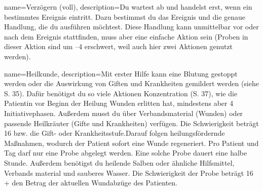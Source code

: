 {
    name={Verzögern (voll)},
    description={Du wartest ab und handelst erst, wenn ein bestimmtes Ereignis eintritt. Dazu bestimmst du das Ereignis und die genaue Handlung, die du ausführen möchtest. Diese Handlung kann unmittelbar vor oder nach dem Ereignis stattfinden, muss aber eine einfache Aktion sein (Proben in dieser Aktion sind um –4 erschwert, weil auch hier zwei Aktionen genutzt werden).}
}


{
    name={Heilkunde},
    description={Mit erster Hilfe kann eine Blutung gestoppt werden oder die Auswirkung von Giften und Krankheiten gemildert werden (siehe S. 35). Dafür benötigst du so viele Aktionen Konzentration (S. 37), wie die Patientin vor Beginn der Heilung Wunden erlitten hat, mindestens aber 4 Initiativephasen. Außerdem musst du über Verbandsmaterial (Wunden) oder passende Heilkräuter (Gifte und Krankheiten) verfügen. Die Schwierigkeit beträgt 16 bzw. die Gift- oder Krankheitsstufe.\newline     Darauf folgen heilungsfördernde Maßnahmen, wodurch der Patient sofort eine Wunde regeneriert. Pro Patient und Tag darf nur eine Probe abgelegt werden. Eine solche Probe dauert eine halbe Stunde. Außerdem benötigst du heilende Salben oder ähnliche Hilfsmittel, Verbands material und sauberes Wasser. Die Schwierigkeit der Probe beträgt 16 + den Betrag der aktuellen Wundabzüge des Patienten.}
}


